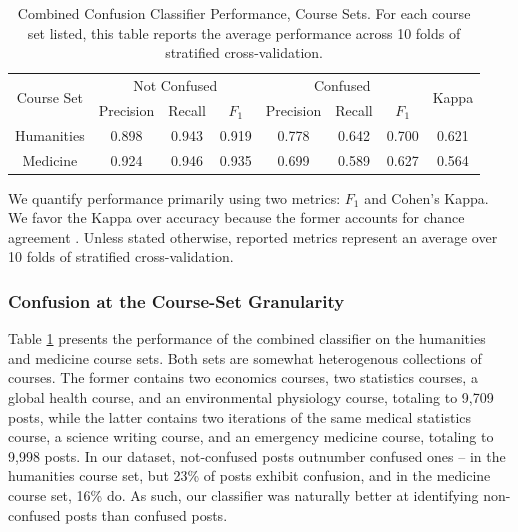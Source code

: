 \documentclass{edm_template}
\begin{document}
\begin{table}[htp!]
    \centering
    \begin{tabular}{|c|c c c|c c c|c|}
    \hline
    \multirow{2}{*}{Course Set} & \multicolumn{3}{c|}{Not Confused} & \multicolumn{3}{c|}{Confused}  & \multirow{2}{*}{Kappa} \\ \cline{2-7}
                                &  Precision & Recall & $F_{1}$     &  Precision & Recall & $F_{1}$  &       \\ \hline
    Humanities                  & 0.898      & 0.943    & 0.919     & 0.778      & 0.642  & 0.700    & 0.621  \\ \hline
    Medicine                    & 0.924      & 0.946    & 0.935     & 0.699      & 0.589  & 0.627    & 0.564  \\ \hline

    \end{tabular}
    \caption{\textnormal{
       Combined Confusion Classifier Performance, Course Sets. For each course set listed, this table reports the average performance across 10 folds of stratified cross-validation.
    }} %
    \label{table:confusion_sets} %
\end{table}

We quantify performance primarily using two metrics: $F_{1}$ and Cohen's Kappa. We favor the Kappa over accuracy because the former accounts for chance agreement \cite{cohen1960coefficient}. Unless stated otherwise, reported metrics represent an average over 10 folds of stratified cross-validation. 

\subsubsection{Confusion at the Course-Set Granularity}
Table \ref{table:confusion_sets} presents the performance of the combined classifier on the humanities and medicine course sets. Both sets are somewhat heterogenous collections of courses. The former contains two economics courses, two statistics courses, a global health course, and an environmental physiology course, totaling to 9,709 posts, while the latter contains two iterations of the same medical statistics course, a science writing course, and an emergency medicine course, totaling to 9,998 posts. In our dataset, not-confused posts outnumber confused ones -- in the humanities course set, but 23\% of posts exhibit confusion, and in the medicine course set, 16\% do. As such, our classifier was naturally better at identifying non-confused posts than confused posts.
\end{document}
